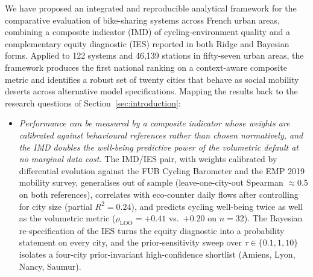 \documentclass[11pt,a4paper]{article}
\begin{document}
We have proposed an integrated and reproducible analytical
framework for the comparative evaluation of bike-sharing systems
across French urban areas, combining a composite indicator
(IMD) of cycling-environment quality and a complementary equity
diagnostic (IES) reported in both Ridge and Bayesian forms.
Applied to 122 systems and 46{,}139 stations in fifty-seven
urban areas, the framework produces the first national ranking
on a context-aware composite metric and identifies a robust set
of twenty cities that behave as social mobility deserts across
alternative model specifications. Mapping the results back to the
research questions of Section~\ref{sec:introduction}:

\begin{itemize}
\item[\textbf{Q1.}] \emph{Performance can be measured by a
composite indicator whose weights are calibrated against
behavioural references rather than chosen normatively, and the
IMD doubles the well-being predictive power of the volumetric
default at no marginal data cost.} The IMD/IES pair, with weights
calibrated by differential evolution against the FUB Cycling
Barometer and the EMP 2019 mobility survey, generalises out of
sample (leave-one-city-out Spearman $\approx 0.5$ on both
references), correlates with eco-counter daily flows after
controlling for city size (partial $R^{2} = 0.24$), and predicts
cycling well-being twice as well as the volumetric metric
($\rho_{\text{LOO}} = +0.41$ vs.\ $+0.20$ on $n = 32$). The
Bayesian re-specification of the IES turns the equity diagnostic
into a probability statement on every city, and the
prior-sensitivity sweep over $\tau \in \{0.1, 1, 10\}$ isolates
a four-city prior-invariant high-confidence shortlist (Amiens,
Lyon, Nancy, Saumur).


\end{itemize}
\end{document}
